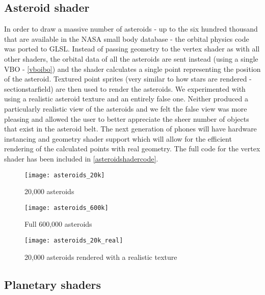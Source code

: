 \pagebreak
\subsection{Asteroid shader}
In order to draw a massive number of asteroids - up to the six hundred thousand that are available in the NASA small body database - the orbital physics code was ported to GLSL. Instead of passing geometry to the vertex shader as with all other shaders, the orbital data of all the asteroids are sent instead (using a single VBO - \cref{vboibo}) and the shader calculates a single point representing the position of the asteroid. Textured point sprites (very similar to how stars are rendered - section{starfield}) are then used to render the asteroids. We experimented with using a realistic asteroid texture and an entirely false one. Neither produced a particularly realistic view of the asteroids and we felt the false view was more pleasing and allowed the user to better appreciate the sheer number of objects that exist in the asteroid belt. The next generation of phones will have hardware instancing and geometry shader support which will allow for the efficient rendering of the calculated points with real geometry. The full code for the vertex shader has been included in \cref{asteroidshadercode}.

\begin{figure}[!htbp]
\centering
\begin{minipage}{.5\textwidth}
  \centering
  \texttt{[image: asteroids\_20k]}
  \caption{20,000 asteroids}
  \label{fig:ast1}
\end{minipage}%
\begin{minipage}{.5\textwidth}
  \centering
  \texttt{[image: asteroids\_600k]}
  \caption{Full 600,000 asteroids}
  \label{fig:ast2}
\end{minipage}
\end{figure}
\vspace{-12pt}
\begin{figure}[!htbp]
  \begin{center}
    \leavevmode
    \ifpdf
      \texttt{[image: asteroids\_20k\_real]}
    \fi
    \caption{20,000 asteroids rendered with a realistic texture}
    \label{fig:ast3}
  \end{center}
\end{figure}

\subsection{Planetary shaders}

